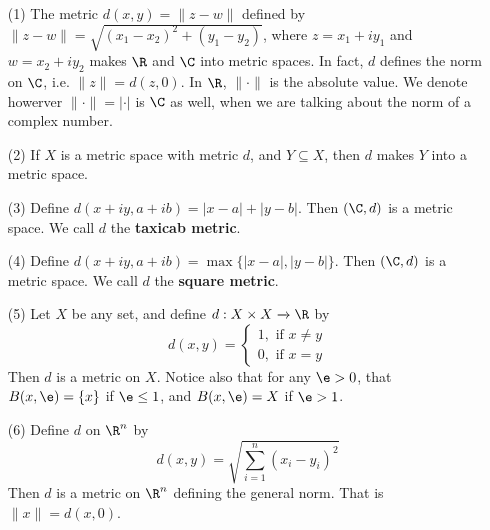 \begin{example}\label{example_2.1}
    \begin{enumerate}
        \item[(1)] The metric $d(x,y)=\|z-w\|$ defined by
            $\|z-w\|=\sqrt{(x_1-x_2)^2+(y_1-y_2)}$, where $z=x_1+iy_1$ and
            $w=x_2+iy_2$ makes $\R$ and  $\C$ into metric spaces. In fact,
            $d$ defines the norm on  $\C$, i.e. $\|z\|=d(z,0)$. In $\R$,
            $\| \cdot \|$ is the absolute value. We denote howerver
            $\| \cdot \|=| \cdot |$ is $\C$ as well, when we are talking about
            the norm of a complex number.

        \item[(2)] If $X$ is a metric space with metric  $d$, and  $Y \subseteq
            X$, then  $d$ makes  $Y$ into a metric space.

        \item[(3)] Define $d(x+iy,a+ib)=|x-a|+|y-b|$. Then $(\C,d)$ is a
            metric space. We call $d$ the  \textbf{taxicab metric}.

        \item[(4)] Define $d(x+iy,a+ib)=\max{\{|x-a|,|y-b|\}}$. Then
            $(\C,d)$ is a metric space. We call $d$ the  \textbf{square metric}.

        \item[(5)] Let $X$ be any set, and define  $d:X \times X \xrightarrow{}
            \R$ by
            \begin{equation*}
                d(x,y)=\begin{cases}
                    1, \text{ if } x \neq y \\
                    0, \text{ if } x=y
                \end{cases}
            \end{equation*}
        Then $d$ is a metric on  $X$. Notice also that for any  $\e>0$, that
        $B(x,\e)=\{x\}$ if $\e \leq 1$, and  $B(x,\e)=X$ if $\e>1$.

    \item[(6)] Define $d$ on  $\R^n$ by
        \begin{equation*}
            d(x,y)=\sqrt{\sum_{i=1}^n{(x_i-y_i)^2}}
        \end{equation*}
        Then $d$ is a metric on $\R^n$ defining the general norm. That is
        $\|x\|=d(x,0)$.


\end{enumerate}
\end{example}
